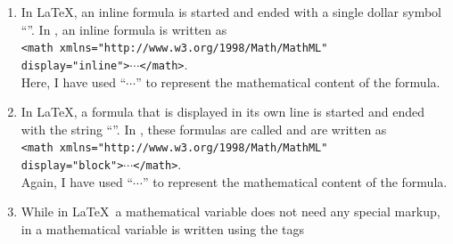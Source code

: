 \begin{enumerate}
\begin{enumerate}
            \texttt{<body>}.
      \item After that, the \LaTeX\ file consists of text that contains mathematical formulas.
      \item The \LaTeX\ input file finishes with a line of the form
            \\[0.2cm]
            \hspace*{1.3cm}
            \texttt{end\{document\}}.
            \\[0.2cm]
            This line is translated into the tags
            \\[0.2cm]
            \hspace*{1.3cm}
            \texttt{</body></html>}
            \\[0.2cm]
            and everything that follows it is discarded.
      \end{enumerate}
\item In \LaTeX, an inline formula is started and ended with a single dollar symbol
      ``\texttt{}''.  
      In , an inline formula is written as
      \\[0.2cm]
      \hspace*{1.3cm}
      \texttt{<math xmlns="http://www.w3.org/1998/Math/MathML"}
      \\
      \hspace*{2.3cm}
      \texttt{display="inline">$\cdots$</math>}.
      \\[0.2cm]
      Here, I have used ``$\cdots$'' to represent the mathematical content of the formula.
\item In \LaTeX, a formula that is displayed in its own line is started and ended with the string
      ``\texttt{}''.  
      In , these formulas are called  and are written as
      \\[0.2cm]
      \hspace*{1.3cm}
      \texttt{<math xmlns="http://www.w3.org/1998/Math/MathML"}
      \\
      \hspace*{2.3cm}
      \texttt{display="block">$\cdots$</math>}.
      \\[0.2cm]
      Again, I have used ``$\cdots$'' to represent the mathematical content of the formula.
\item While in \LaTeX\ a mathematical variable does not need any special markup, in 
      a mathematical variable is written using the tags 

\end{enumerate}
